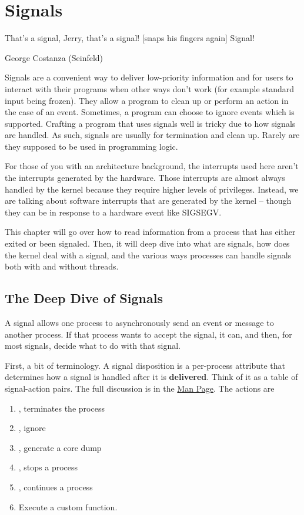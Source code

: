 \chapter{Signals}

\epigraph{That's a signal, Jerry, that's a signal! [snaps his fingers again] Signal!}{George Costanza (Seinfeld)}

Signals are a convenient way to deliver low-priority information and for users to interact with their programs when other ways don't work (for example standard input being frozen).
They allow a program to clean up or perform an action in the case of an event.
Sometimes, a program can choose to ignore events which is supported.
Crafting a program that uses signals well is tricky due to how signals are handled.
As such, signals are usually for termination and clean up.
Rarely are they supposed to be used in programming logic.

For those of you with an architecture background, the interrupts used here aren't the interrupts generated by the hardware.
Those interrupts are almost always handled by the kernel because they require higher levels of privileges.
Instead, we are talking about software interrupts that are generated by the kernel -- though they can be in response to a hardware event like SIGSEGV.

This chapter will go over how to read information from a process that has either exited or been signaled.
Then, it will deep dive into what are signals, how does the kernel deal with a signal, and the various ways processes can handle signals both with and without threads.

\section{The Deep Dive of Signals}

A signal allows one process to \gls{asynchronously} send an event or message to another process.
If that process wants to accept the signal, it can, and then, for most signals, decide what to do with that signal.

First, a bit of terminology.
A \gls{signal disposition} is a per-process attribute that determines how a signal is handled after it is \textbf{delivered}.
Think of it as a table of signal-action pairs.
The full discussion is in the \href{http://man7.org/linux/man-pages/man7/signal.7.html}{Man Page}.
The actions are
\begin{enumerate}
  \item {}, terminates the process
  \item {}, ignore
  \item {}, generate a core dump
  \item {}, stops a process
  \item {}, continues a process
  \item Execute a custom function.
\end{enumerate}

